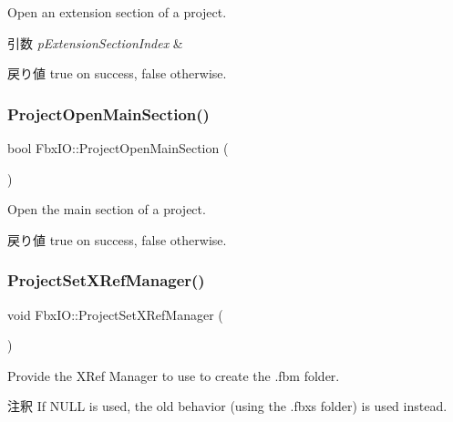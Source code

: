 Open an extension section of a project. 
\begin{DoxyParams}{引数}
{\em p\+Extension\+Section\+Index} & \\
\hline
\end{DoxyParams}
\begin{DoxyReturn}{戻り値}
{\ttfamily true} on success, {\ttfamily false} otherwise. 
\end{DoxyReturn}
\mbox{\label{class_fbx_i_o_aad4f715a886ebfc218f54b1387804190}} 
\subsubsection{\texorpdfstring{Project\+Open\+Main\+Section()}{ProjectOpenMainSection()}}
{\footnotesize\ttfamily bool Fbx\+I\+O\+::\+Project\+Open\+Main\+Section (\begin{DoxyParamCaption}{ }\end{DoxyParamCaption})}

Open the main section of a project. \begin{DoxyReturn}{戻り値}
{\ttfamily true} on success, {\ttfamily false} otherwise. 
\end{DoxyReturn}
\mbox{\label{class_fbx_i_o_a7064f301bce688c750ed1427e5babc61}} 
\subsubsection{\texorpdfstring{Project\+Set\+X\+Ref\+Manager()}{ProjectSetXRefManager()}}
{\footnotesize\ttfamily void Fbx\+I\+O\+::\+Project\+Set\+X\+Ref\+Manager (\begin{DoxyParamCaption}\item[{const \hyperlink{class_fbx_x_ref_manager}{Fbx\+X\+Ref\+Manager} $\ast$}]{ }\end{DoxyParamCaption})}

Provide the X\+Ref Manager to use to create the .fbm folder. \begin{DoxyRemark}{注釈}
If N\+U\+LL is used, the old behavior (using the .fbx\textquotesingle{}s folder) is used instead. 
\end{DoxyRemark}
\mbox{\label{class_fbx_i_o_a6efe694fd5980f3990d6146f830106a3}} 
